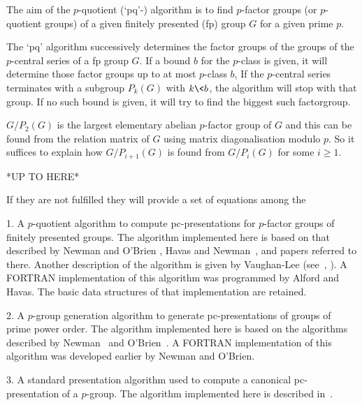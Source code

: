 
The aim of the $p$-quotient (`pq'-) algorithm is  to  find  $p$-factor
groups (or $p$-quotient groups) of a  given  finitely  presented  (fp)
group $G$ for a given prime $p$.

The `pq' algorithm successively  determines  the  factor  groups  of  the
groups of the $p$-central series of a fp group $G$. If a  bound  $b$  for
the $p$-class is given, it will determine those factor groups  up  to  at
most $p$-class $b$, If the $p$-central series terminates with a  subgroup
$P_k(G)$ with $k \< b$, the algorithm will stop with that  group.  If  no
such bound is given, it will try to find the biggest such factorgroup.

$G/P_2(G)$ is the largest elementary  abelian $p$-factor group of $G$ and
this  can  be found  from  the relation  matrix  of  $G$ using  matrix
diagonalisation modulo $p$. So  it suffices to explain how $G/P_{i+1}(G)$
is found from $G/P_i(G)$ for some $i \ge 1$.

*UP TO HERE*

If they are  not fulfilled they will provide a  set of equations among
the 


\beginlist

\item{1.}
A $p$-quotient  algorithm  to  compute  pc-presentations  for  $p$-factor
groups of finitely presented groups. The algorithm  implemented  here  is
based on that described by Newman  and  O'Brien  \cite{NO96},  Havas  and
Newman~\cite{HN80}, and papers referred to there. Another description  of
the algorithm is given by Vaughan-Lee (see~\cite{Vau90a}, \cite{Vau90b}).
A FORTRAN implementation of this algorithm was programmed by  Alford  and
Havas. The basic data structures of that implementation are retained.

\item{2.} 
A $p$-group generation algorithm to generate pc-presentations  of  groups
of prime power order. The algorithm implemented  here  is  based  on  the
algorithms described by Newman~\cite{New77} and  O'Brien~\cite{OBr90}.  A
FORTRAN implementation of this algorithm was developed earlier by  Newman
and O'Brien.

\item{3.}
A  standard  presentation  algorithm  used   to   compute   a   canonical
pc-presentation  of  a  $p$-group.  The  algorithm  implemented  here  is
described in~\cite{OBr94}.


